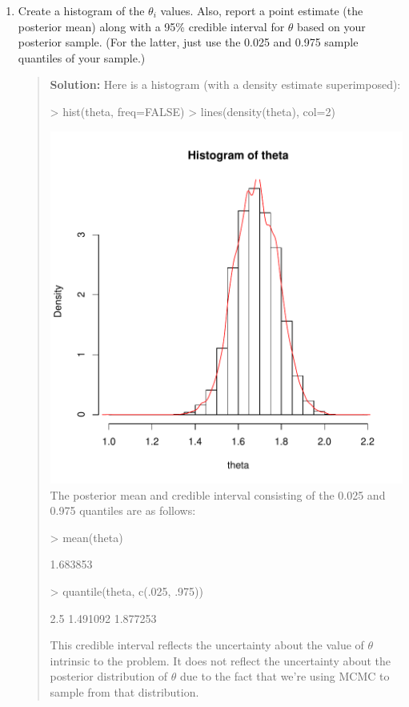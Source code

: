 \documentclass{article}
\begin{document}
\begin{enumerate}
\begin{enumerate}
      \item Create a histogram of the $\theta_i$ values. Also, report a point
      estimate (the posterior mean) along with a 95\% credible interval for
      $\theta$ based on your posterior sample. (For the latter, just use the
      0.025 and 0.975 sample quantiles of your sample.)
      \begin{quotation}{\bf Solution:}
      Here is a histogram (with a density estimate superimposed):
\begin{Schunk}
\begin{Sinput}
> hist(theta, freq=FALSE)
> lines(density(theta), col=2)
\end{Sinput}
\end{Schunk}
\includegraphics{sol11-003}
      The posterior mean and credible interval consisting of the 0.025 and 0.975
      quantiles are as follows:
\begin{Schunk}
\begin{Sinput}
> mean(theta)
\end{Sinput}
\begin{Soutput}
[1] 1.683853
\end{Soutput}
\begin{Sinput}
> quantile(theta, c(.025, .975))
\end{Sinput}
\begin{Soutput}
    2.5%
1.491092 1.877253 
\end{Soutput}
\end{Schunk}
      This credible interval reflects the uncertainty about the value of $\theta$ 
      intrinsic to the problem.  It does not reflect the uncertainty about the 
      posterior distribution of $\theta$ due to the fact that we're using MCMC to 
      sample from that distribution.  
      \end{quotation}
      

\end{enumerate}
\end{enumerate}
\end{document}
